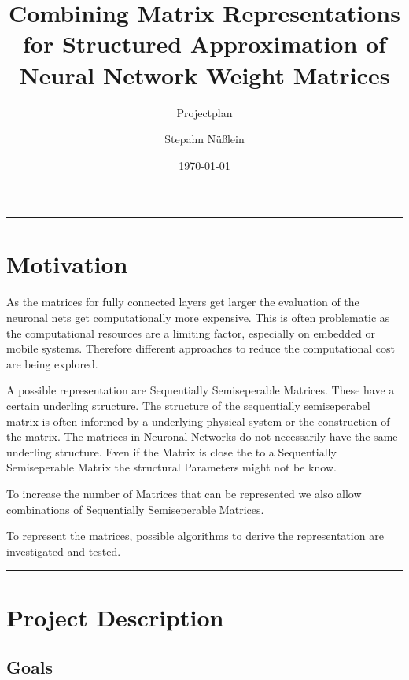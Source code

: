 \documentclass[lang=ngerman,inputenc=utf8,fontsize=10pt]{ldvarticle}
\title{Combining Matrix Representations for Structured Approximation of Neural Network Weight Matrices}
\subtitle{Projectplan}
\author{Stepahn Nüßlein}
\date{\today}
\begin{document}
	\maketitle
	\thispagestyle{empty}
	\vspace*{2cm}
	\hrule

\section*{Motivation}

As the matrices for fully connected layers get larger the evaluation of the neuronal nets get computationally more expensive. This is often problematic as the computational resources are a limiting factor, especially on embedded or mobile systems.
Therefore different approaches to reduce the computational cost are being explored.

A possible representation are Sequentially Semiseperable Matrices. These have a certain underling structure.
The structure of the sequentially semiseperabel matrix is often informed by a underlying physical system or the construction of the matrix.
The matrices in Neuronal Networks do not necessarily have the same underling structure.
Even if the Matrix is close the to a Sequentially Semiseperable Matrix the structural Parameters might not be know.

To increase the number of Matrices that can be represented we also allow combinations of Sequentially Semiseperable Matrices.

To represent the matrices, possible algorithms to derive the representation are investigated and tested.




\vspace*{1cm}
\hrule

\newpage

\section{Project Description}

\subsection*{Goals}
\end{document}
